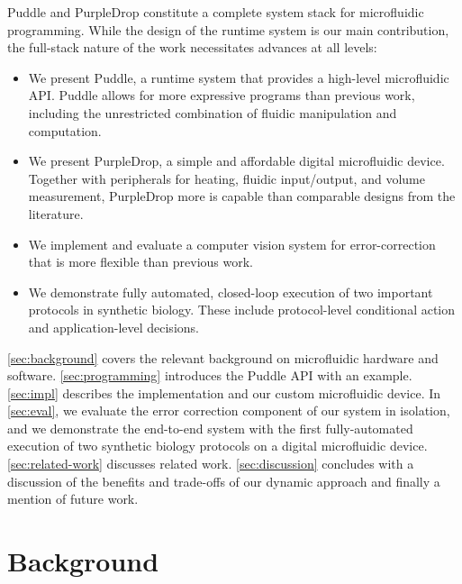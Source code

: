 \documentclass[sigplan, screen]{acmart}
\newcommand\mw[2][]{\todo[color=blue!20, #1]{\sf #2}}
\begin{document}
Puddle and PurpleDrop constitute a complete system stack for microfluidic programming.
While the design of the runtime system is our main contribution, the full-stack nature of the work necessitates advances at all levels:
\begin{itemize}
  \item We present Puddle, a runtime system that provides a high-level microfluidic API. Puddle allows for more expressive programs than previous work, including the unrestricted combination of fluidic manipulation and computation.
\item We present PurpleDrop, a simple and affordable digital microfluidic device. Together with peripherals for heating, fluidic input/output, and volume measurement, PurpleDrop more is capable than comparable designs from the literature.
\item We implement and evaluate a computer vision system for error-correction that is more flexible than previous work.
\item We demonstrate fully automated, closed-loop execution of two important protocols in synthetic biology.
  These include protocol-level conditional action and application-level decisions.
\end{itemize}

\autoref{sec:background} covers the relevant background on microfluidic hardware and software.
\autoref{sec:programming} introduces the Puddle API with an example.
\autoref{sec:impl} describes the implementation and our custom microfluidic device.
In \autoref{sec:eval}, we evaluate the error correction component of our system in isolation, and we demonstrate the end-to-end system with the first fully-automated execution of two synthetic biology protocols on a digital microfluidic device.
\autoref{sec:related-work} discusses related work.
\autoref{sec:discussion} concludes with a discussion of the benefits and trade-offs of our dynamic approach and finally a mention of future work.

\section{Background}
\label{sec:background}
\end{document}
